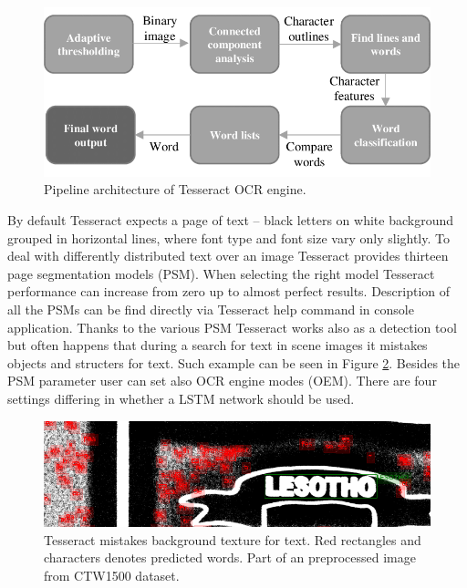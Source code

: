 \begin{figure}[hbtp]
    \centering
    \includegraphics[scale=0.4]{obrazky/tesseract.png}
    \caption{Pipeline architecture of Tesseract OCR engine. \cite{tessPipeline}}
    \label{img:tesseractPipeline}
\end{figure}


By default Tesseract expects a page of text -- black letters on white background grouped in horizontal lines, where font type and font size vary only slightly. To deal with differently distributed text over an image Tesseract provides thirteen page segmentation models (PSM). When selecting the right model Tesseract performance can increase from zero up to almost perfect results. Description of all the PSMs can be find directly via Tesseract help command in console application. Thanks to the various PSM Tesseract works also as a detection tool but often happens that during a search for text in scene images it mistakes objects and structers for text. Such example can be seen in Figure \ref*{img:tesseractMiss}. Besides the PSM parameter user can set also OCR engine modes (OEM). There are four settings differing in whether a LSTM network should be used. 

\begin{figure}[hbtp]
    \centering
    \includegraphics[scale=0.55]{obrazky/result_tesseract_CTW_u_miss.png}
    \caption{Tesseract mistakes background texture for text. Red rectangles and characters denotes predicted words. Part of an preprocessed image from CTW1500 dataset.}
    \label{img:tesseractMiss}
\end{figure}


